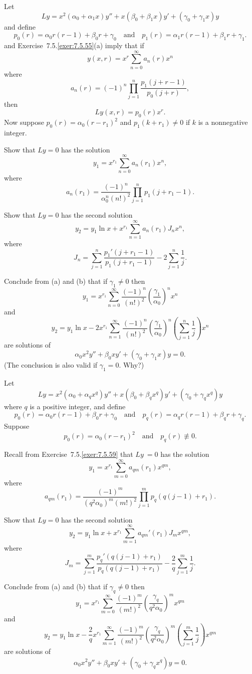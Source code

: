 \begin{exerciselist}
\item\label{exer:7.6.54}Let
\[
Ly=x^2(\alpha_0+\alpha_1x)y''+x(\beta_0+\beta_1x)y'+(\gamma_0+\gamma_1x)y
\]
and define
\[
p_0(r)=\alpha_0r(r-1)+\beta_0r+\gamma_0\quad\text{and}\quad
p_1(r)=\alpha_1r(r-1)+\beta_1r+\gamma_1.
\]
  and {Exercise~7.5.\ref{exer:7.5.55}}(a)
imply that if
\[
y(x,r)=x^r\sum_{n=0}^\infty a_n(r)x^n
\]
where
\[
a_n(r)=(-1)^n\prod_{j=1}^n\frac{p_1(j+r-1)}{p_0(j+r)},
\]
then
\[
Ly(x,r)=p_0(r)x^r.
\]
Now suppose
$p_0(r)=\alpha_0(r-r_1)^2$ and $p_1(k+r_1)\ne0$ if $k$
is a nonnegative integer.
\begin{alist}
\item %
Show that $Ly=0$ has the solution
\[
y_1=x^{r_1}\sum_{n=0}^\infty a_n(r_1)x^n,
\]
where
\[
a_n(r_1)=\frac{(-1)^n}{\alpha_0^n(n!)^2}\prod_{j=1}^np_1(j+r_1-1).
\]
\item %
Show that $Ly=0$ has the second solution
\[
y_2=y_1\ln x+x^{r_1}\sum_{n=1}^\infty a_n(r_1)J_nx^n,
\]
where
\[
J_n=\sum_{j=1}^n\frac{p_1'(j+r_1-1)}{p_1(j+r_1-1)}-2\sum_{j=1}^n\frac{1}{j}.
\]
\item %
Conclude from (a) and (b) that if
 $\gamma_1\ne0$ then
\[
y_1=x^{r_1}\sum_{n=0}^\infty
\frac{(-1)^n}{(n!)^2}\left(\frac{\gamma_1}{\alpha_0}\right)^nx^n
\]
and
\[
y_2=y_1\ln x-2x^{r_1}\sum_{n=1}^\infty
\frac{(-1)^n}{(n!)^2}\left(\frac{\gamma_1}{\alpha_0}\right)^n
\left(\sum_{j=1}^n\frac{1}{j}\right)x^n
\]
are solutions of
\[
\alpha_0x^2y''+\beta_0xy'+(\gamma_0+\gamma_1x)y=0.
\]
(The conclusion is also valid if $\gamma_1=0$. Why?)
\end{alist}

\item\label{exer:7.6.55}Let
\[
Ly=x^2(\alpha_0+\alpha_qx^q)y''+x(\beta_0+\beta_qx^q)y'+(\gamma_0+\gamma_qx^q)y
\]
where $q$ is a positive integer, and define
\[
p_0(r)=\alpha_0r(r-1)+\beta_0r+\gamma_0\quad\text{and}\quad
p_q(r)=\alpha_qr(r-1)+\beta_qr+\gamma_q.
\]
Suppose
\[
p_0(r)=\alpha_0(r-r_1)^2 \quad\text{and}\quad p_q(r)\not\equiv0.
\]
\begin{alist}
\item %
Recall from  {Exercise~7.5.\ref{exer:7.5.59}}  that
 $Ly~=0$ has the solution
\[
y_1=x^{r_1}\sum_{m=0}^\infty a_{qm}(r_1)x^{qm},
\]
where
\[
a_{qm}(r_1)=\frac{(-1)^m}{(q^2\alpha_0)^m(m!)^2}\prod_{j=1}^mp_q\left(q(j-1)+r_1\right).
\]
\item %
Show that $Ly=0$ has the second solution
\[
y_2=y_1\ln x+x^{r_1}\sum_{m=1}^\infty a_{qm}'(r_1)J_mx^{qm},
\]
where
\[
J_m=\sum_{j=1}^m\frac{p_q'\left(q(j-1)+r_1\right)}{p_q\left(q(j-1)+r_1\right)}-\frac{2}{q}\sum_{j=1}^m\frac{1}{j}.
\]
\item %
Conclude from (a) and (b) that if
 $\gamma_q\ne0$ then
\[
y_1=x^{r_1}\sum_{m=0}^\infty
\frac{(-1)^m}{(m!)^2}\left(\frac{\gamma_q}{q^2\alpha_0}\right)^mx^{qm}
\]
and
\[
y_2=y_1\ln x-\frac{2}{q}x^{r_1}\sum_{m=1}^\infty
\frac{(-1)^m}{(m!)^2}\left(\frac{\gamma_q}{q^2\alpha_0}\right)^m\left(\sum_{j=1}^m\frac{1}{j}\right)x^{qm}
\]
are solutions of
\[
\alpha_0x^2y''+\beta_0xy'+(\gamma_0+\gamma_qx^q)y=0.
\]
\end{alist}


\end{exerciselist}
